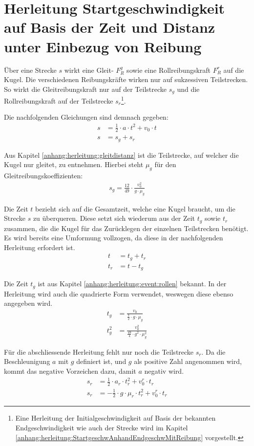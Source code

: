 \section{Herleitung Startgeschwindigkeit auf Basis der Zeit und Distanz unter Einbezug von Reibung}\label{anhang:herleitung:initialVelocityWithTime}
Über eine Strecke $s$ wirkt eine Gleit- $F^g_R$ sowie eine Rollreibungskraft $F^r_R$ auf die Kugel.
Die verschiedenen Reibungskräfte wirken nur auf sukzessiven Teilstrecken. So wirkt die Gleitreibungskraft nur auf
der Teilstrecke $s_g$ und die Rollreibungskraft auf der Teilstrecke $s_r$\footnote{Eine Herleitung der Initialgeschwindigkeit
auf Basis der bekannten Endgeschwindigkeit wie auch der Strecke wird im Kapitel \ref{anhang:herleitung:StartgeschwAnhandEndgeschwMitReibung} vorgestellt.}.

Die nachfolgenden Gleichungen sind demnach gegeben:
\begin{align}
    s &= \frac{1}{2} \cdot a \cdot t^2 + v_0 \cdot t\\
    s &= s_g + s_r
\end{align}

Aus Kapitel \ref{anhang:herleitung:gleitdistanz} ist die Teilstrecke, auf welcher die Kugel nur gleitet, zu entnehmen.
Hierbei steht $\mu_g$ für den Gleitreibungskoeffizienten:
\begin{align}
    s_g = \frac{12}{49} \cdot \frac{v_0^2}{g \cdot \mu_g}
\end{align}

Die Zeit $t$ bezieht sich auf die Gesamtzeit, welche eine Kugel braucht, um die Strecke $s$ zu überqueren.
Diese setzt sich wiederum aus der Zeit $t_g$ sowie $t_r$ zusammen, die die Kugel für das Zurücklegen der einzelnen
Teilstrecken benötigt. Es wird bereits eine Umformung vollzogen, da diese in der nachfolgenden Herleitung erfordert ist.
\begin{align}
    t &= t_g + t_r\\
    t_r &= t - t_g
\end{align}

Die Zeit $t_g$ ist aus Kapitel \ref{anhang:herleitung:event:rollen} bekannt. In der Herleitung wird auch die quadrierte
Form verwendet, weswegen diese ebenso angegeben wird.
\begin{align}
    t_g &= \frac{v_0}{\frac{7}{2} \cdot g \cdot \mu_g}\\
    t_g^2 &= \frac{v_0^2}{\frac{49}{4} \cdot g^2 \cdot \mu_g^2}
\end{align}

Für die abschliessende Herleitung fehlt nur noch die Teilstrecke $s_r$.
Da die Beschleunigung $a$ mit $g$ definiert ist, und $g$ als positive Zahl angenommen wird,
kommt das negative Vorzeichen dazu, damit $a$ negativ wird.
\begin{align}
    s_r &= \frac{1}{2} \cdot a_r \cdot t_r^2 + v^r_0 \cdot t_r\\
    s_r &= - \frac{1}{2} \cdot g \cdot \mu_r \cdot t_r^2 + v^r_0 \cdot t_r
\end{align}


